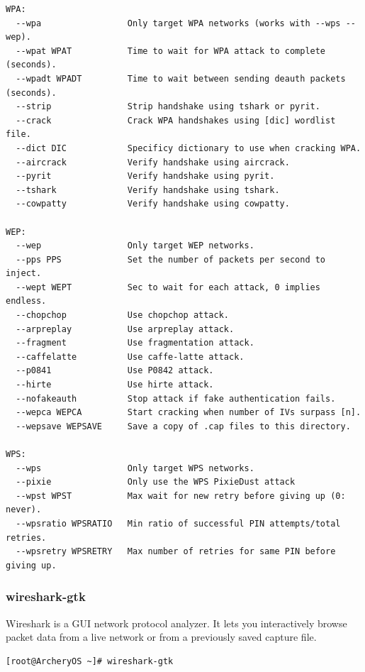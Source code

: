 \documentclass{article}
\begin{document}
\begin{lstlisting}
WPA:
  --wpa                 Only target WPA networks (works with --wps --wep).
  --wpat WPAT           Time to wait for WPA attack to complete (seconds).
  --wpadt WPADT         Time to wait between sending deauth packets (seconds).
  --strip               Strip handshake using tshark or pyrit.
  --crack               Crack WPA handshakes using [dic] wordlist file.
  --dict DIC            Specificy dictionary to use when cracking WPA.
  --aircrack            Verify handshake using aircrack.
  --pyrit               Verify handshake using pyrit.
  --tshark              Verify handshake using tshark.
  --cowpatty            Verify handshake using cowpatty.

WEP:
  --wep                 Only target WEP networks.
  --pps PPS             Set the number of packets per second to inject.
  --wept WEPT           Sec to wait for each attack, 0 implies endless.
  --chopchop            Use chopchop attack.
  --arpreplay           Use arpreplay attack.
  --fragment            Use fragmentation attack.
  --caffelatte          Use caffe-latte attack.
  --p0841               Use P0842 attack.
  --hirte               Use hirte attack.
  --nofakeauth          Stop attack if fake authentication fails.
  --wepca WEPCA         Start cracking when number of IVs surpass [n].
  --wepsave WEPSAVE     Save a copy of .cap files to this directory.

WPS:
  --wps                 Only target WPS networks.
  --pixie               Only use the WPS PixieDust attack
  --wpst WPST           Max wait for new retry before giving up (0: never).
  --wpsratio WPSRATIO   Min ratio of successful PIN attempts/total retries.
  --wpsretry WPSRETRY   Max number of retries for same PIN before giving up.
\end{lstlisting}

\subsubsection{wireshark-gtk}
 Wireshark is a GUI network protocol analyzer.  It lets you interactively browse packet data from a live network or from a previously saved capture file.
\begin{lstlisting}
[root@ArcheryOS ~]# wireshark-gtk
\end{lstlisting}
\end{document}
